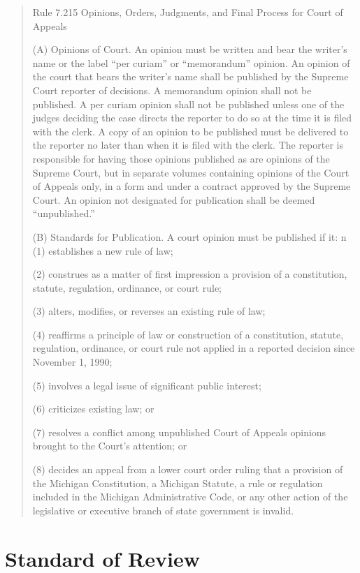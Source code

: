 \documentclass[12pt,\documentclassflag]{michiganCourtOfAppealsBrief}
\begin{document}
\begin{quotation}
  Rule 7.215 Opinions, Orders, Judgments, and Final Process for Court of Appeals

(A) Opinions of Court. An opinion must be written and bear the writer's name or the label ``per curiam'' or ``memorandum'' opinion. An opinion of the court that bears the writer's name shall be published by the Supreme Court reporter of decisions. A memorandum opinion shall not be published. A per curiam opinion shall not be published unless one of the judges deciding the case directs the reporter to do so at the time it is filed with the clerk. A copy of an opinion to be published must be delivered to the reporter no later than when it is filed with the clerk. The reporter is responsible for having those opinions published as are opinions of the Supreme Court, but in separate volumes containing opinions of the Court of Appeals only, in a form and under a contract approved by the Supreme Court. An opinion not designated for publication shall be deemed ``unpublished.''

(B) Standards for Publication. A court opinion must be published if it:
n
(1) establishes a new rule of law;

(2) construes as a matter of first impression a provision of a constitution, statute, regulation, ordinance, or court rule;

(3) alters, modifies, or reverses an existing rule of law;

(4) reaffirms a principle of law or construction of a constitution, statute, regulation, ordinance, or court rule not applied in a reported decision since November 1, 1990;

(5) involves a legal issue of significant public interest;

(6) criticizes existing law; or

(7) resolves a conflict among unpublished Court of Appeals opinions brought to the Court's attention; or

(8) decides an appeal from a lower court order ruling that a provision of the Michigan Constitution, a Michigan Statute, a rule or regulation included in the Michigan Administrative Code, or any other action of the legislative or executive branch of state government is invalid.
\end{quotation}


\section{Standard of Review}
\end{document}
